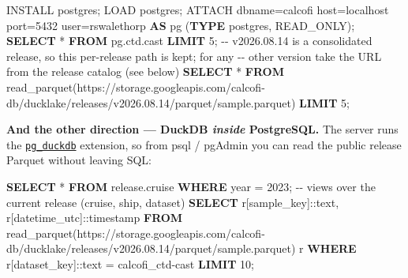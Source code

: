 \documentclass[
  letterpaper,
  DIV=11,
  numbers=noendperiod]{scrreprt}
\newenvironment{Shaded}{\begin{snugshade}}{\end{snugshade}}
\newcommand{\CharTok}[1]{\textcolor[rgb]{0.13,0.47,0.30}{#1}}
\newcommand{\CommentTok}[1]{\textcolor[rgb]{0.37,0.37,0.37}{#1}}
\newcommand{\DataTypeTok}[1]{\textcolor[rgb]{0.68,0.00,0.00}{#1}}
\newcommand{\DecValTok}[1]{\textcolor[rgb]{0.68,0.00,0.00}{#1}}
\newcommand{\FunctionTok}[1]{\textcolor[rgb]{0.28,0.35,0.67}{#1}}
\newcommand{\KeywordTok}[1]{\textcolor[rgb]{0.00,0.23,0.31}{\textbf{#1}}}
\newcommand{\NormalTok}[1]{\textcolor[rgb]{0.00,0.23,0.31}{#1}}
\newcommand{\OperatorTok}[1]{\textcolor[rgb]{0.37,0.37,0.37}{#1}}
\newcommand{\StringTok}[1]{\textcolor[rgb]{0.13,0.47,0.30}{#1}}
\begin{document}
\begin{Shaded}
\begin{Highlighting}[]
\NormalTok{INSTALL postgres; LOAD postgres;}
\NormalTok{ATTACH }\StringTok{\textquotesingle{}dbname=calcofi host=localhost port=5432 user=rswalethorp\textquotesingle{}} \KeywordTok{AS}\NormalTok{ pg (}\KeywordTok{TYPE}\NormalTok{ postgres, READ\_ONLY);}
\KeywordTok{SELECT} \OperatorTok{*} \KeywordTok{FROM}\NormalTok{ pg.ctd.}\FunctionTok{cast} \KeywordTok{LIMIT} \DecValTok{5}\NormalTok{;}
\CommentTok{{-}{-} v2026.08.14 is a consolidated release, so this per{-}release path is kept; for any}
\CommentTok{{-}{-} other version take the URL from the release catalog (see below)}
\KeywordTok{SELECT} \OperatorTok{*} \KeywordTok{FROM}\NormalTok{ read\_parquet(}\StringTok{\textquotesingle{}https://storage.googleapis.com/calcofi{-}db/ducklake/releases/v2026.08.14/parquet/sample.parquet\textquotesingle{}}\NormalTok{) }\KeywordTok{LIMIT} \DecValTok{5}\NormalTok{;}
\end{Highlighting}
\end{Shaded}

\textbf{And the other direction --- DuckDB \emph{inside} PostgreSQL.}
The server runs the
\href{https://github.com/duckdb/pg_duckdb}{\texttt{pg\_duckdb}}
extension, so from psql / pgAdmin you can read the public release
Parquet without leaving SQL:

\begin{Shaded}
\begin{Highlighting}[]
\KeywordTok{SELECT} \OperatorTok{*} \KeywordTok{FROM}\NormalTok{ release.cruise }\KeywordTok{WHERE} \DataTypeTok{year} \OperatorTok{=} \DecValTok{2023}\NormalTok{;        }\CommentTok{{-}{-} views over the current release (cruise, ship, dataset)}
\KeywordTok{SELECT}\NormalTok{ r[}\StringTok{\textquotesingle{}sample\_key\textquotesingle{}}\NormalTok{]:}\CharTok{:text}\NormalTok{, r[}\StringTok{\textquotesingle{}datetime\_utc\textquotesingle{}}\NormalTok{]:}\CharTok{:timestamp}
\KeywordTok{FROM}\NormalTok{ read\_parquet(}\StringTok{\textquotesingle{}https://storage.googleapis.com/calcofi{-}db/ducklake/releases/v2026.08.14/parquet/sample.parquet\textquotesingle{}}\NormalTok{) r}
\KeywordTok{WHERE}\NormalTok{ r[}\StringTok{\textquotesingle{}dataset\_key\textquotesingle{}}\NormalTok{]:}\CharTok{:text} \OperatorTok{=} \StringTok{\textquotesingle{}calcofi\_ctd{-}cast\textquotesingle{}} \KeywordTok{LIMIT} \DecValTok{10}\NormalTok{;}
\end{Highlighting}
\end{Shaded}
\end{document}
